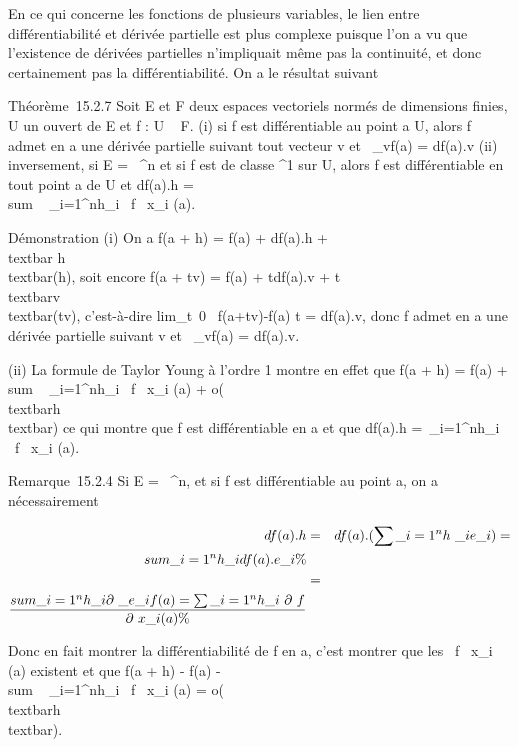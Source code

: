 \documentclass[]{article}
\begin{document}
En ce qui concerne les fonctions de plusieurs variables, le lien entre
différentiabilité et dérivée partielle est plus complexe puisque l'on a
vu que l'existence de dérivées partielles n'impliquait même pas la
continuité, et donc certainement pas la différentiabilité. On a le
résultat suivant

Théorème~15.2.7 Soit E et F deux espaces vectoriels normés de dimensions
finies, U un ouvert de E et f : U \rightarrow~ F. (i) si f est différentiable au
point a \in U, alors f admet en a une dérivée partielle suivant tout
vecteur v et \partial~\_vf(a) = df(a).v (ii) inversement, si E =
~^n et si f est de classe ^1 sur U, alors f est
différentiable en tout point a de U et df(a).h
= \\sum ~
\_i=1^nh\_i \partial~f \over
\partial~x\_i (a).

Démonstration (i) On a f(a + h) = f(a) + df(a).h
+\\textbar{} h\\textbar{}\epsilon(h), soit encore
f(a + tv) = f(a) + tdf(a).v +
\textbar{}t\textbar{}\,\\textbar{}v\\textbar{}\epsilon(tv),
c'est-à-dire lim\_t\rightarrow~0~ f(a+tv)-f(a)
\over t = df(a).v, donc f admet en a une dérivée
partielle suivant v et \partial~\_vf(a) = df(a).v.

(ii) La formule de Taylor Young à l'ordre 1 montre en effet que f(a + h)
= f(a) + \\sum ~
\_i=1^nh\_i \partial~f \over
\partial~x\_i (a) +
o(\\textbar{}h\\textbar{}) ce qui montre
que f est différentiable en a et que df(a).h =\
\sum  \_i=1^nh\_i~ \partial~f
\over \partial~x\_i (a).

Remarque~15.2.4 Si E = ~^n, et si f est différentiable au
point a, on a nécessairement

\begin{align*} df(a).h& =&
df(a).(\sum \_i=1^nh~\_
ie\_i) = \\sum
\_i=1^nh\_ idf(a).e\_i\%&
\\ & =& \\sum
\_i=1^nh\_ i\partial~\_e\_if(a) =
\sum \_i=1^nh\_ i~ \partial~f
\over \partial~x\_i (a) \%&
\\ \end{align*}

Donc en fait montrer la différentiabilité de f en a, c'est montrer que
les  \partial~f \over \partial~x\_i (a) existent et que f(a +
h) - f(a) -\\sum ~
\_i=1^nh\_i \partial~f \over
\partial~x\_i (a) =
o(\\textbar{}h\\textbar{}).
\end{document}
